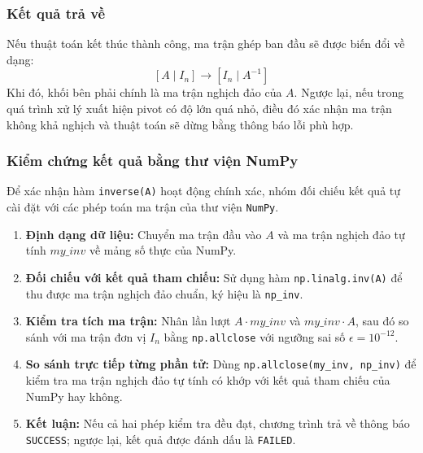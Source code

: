 \documentclass[12pt,a4paper]{article}
\begin{document}
\subsubsection{Kết quả trả về}
\begin{infobox}
Nếu thuật toán kết thúc thành công, ma trận ghép ban đầu sẽ được biến đổi về dạng:
\begin{equation}
\left[A \mid I_n\right] \longrightarrow \left[I_n \mid A^{-1}\right]
\end{equation}
Khi đó, khối bên phải chính là ma trận nghịch đảo của $A$. Ngược lại, nếu trong quá trình xử lý xuất hiện pivot có độ lớn quá nhỏ, điều đó xác nhận ma trận không khả nghịch và thuật toán sẽ dừng bằng thông báo lỗi phù hợp.
\end{infobox}

\subsubsection{Kiểm chứng kết quả bằng thư viện NumPy}
Để xác nhận hàm \texttt{inverse(A)} hoạt động chính xác, nhóm đối chiếu kết quả tự cài đặt với các phép toán ma trận của thư viện \texttt{NumPy}.

\begin{enumerate}[label=\textbf{\alph*)}, leftmargin=*, align=left]
    \item \textbf{Định dạng dữ liệu:} Chuyển ma trận đầu vào $A$ và ma trận nghịch đảo tự tính $my\_inv$ về mảng số thực của NumPy.

    \item \textbf{Đối chiếu với kết quả tham chiếu:} Sử dụng hàm \texttt{np.linalg.inv(A)} để thu được ma trận nghịch đảo chuẩn, ký hiệu là \texttt{np\_inv}.

    \item \textbf{Kiểm tra tích ma trận:} Nhân lần lượt $A \cdot my\_inv$ và $my\_inv \cdot A$, sau đó so sánh với ma trận đơn vị $I_n$ bằng \texttt{np.allclose} với ngưỡng sai số $\epsilon = 10^{-12}$.

    \item \textbf{So sánh trực tiếp từng phần tử:} Dùng \texttt{np.allclose(my\_inv, np\_inv)} để kiểm tra ma trận nghịch đảo tự tính có khớp với kết quả tham chiếu của NumPy hay không.

    \item \textbf{Kết luận:} Nếu cả hai phép kiểm tra đều đạt, chương trình trả về thông báo \texttt{SUCCESS}; ngược lại, kết quả được đánh dấu là \texttt{FAILED}.
\end{enumerate}
\end{document}
